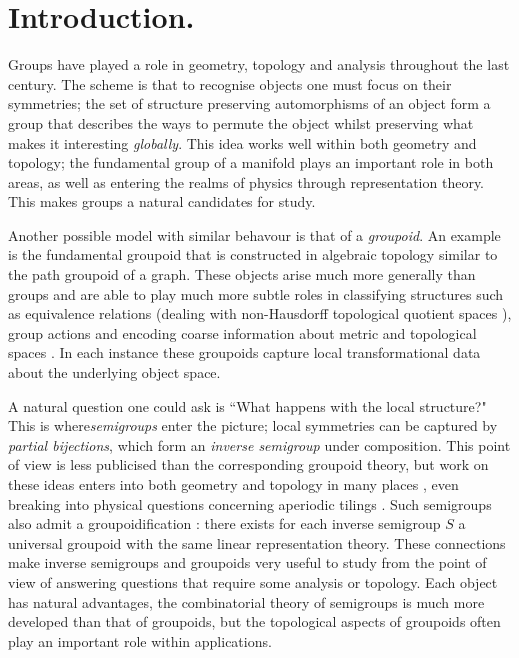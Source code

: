 \chapter{Introduction.}

Groups have played a role in geometry, topology and analysis throughout the last century. The scheme is that to recognise objects one must focus on their symmetries; the set of structure preserving automorphisms of an object form a group that describes the ways to permute the object whilst preserving what makes it interesting \textit{globally}. This idea works well within both geometry and topology; the fundamental group of a manifold plays an important role in both areas, as well as entering the realms of physics through representation theory. This makes groups a natural candidates for study.

Another possible model with similar behavour is that of a \textit{groupoid}. An example is the fundamental groupoid that is constructed in algebraic topology similar to the path groupoid of a graph. These objects arise much more generally than groups and are able to play much more subtle roles in classifying structures such as equivalence relations (dealing with non-Hausdorff topological quotient spaces \cite{MR1826266}), group actions and encoding coarse information about metric and topological spaces \cite{MR1905840}. In each instance these groupoids capture local transformational data about the underlying object space.

A natural question one could ask is ``What happens with the local structure?" This is where\textit{semigroups} enter the picture; local symmetries can be captured by \textit{partial bijections}, which form an \textit{inverse semigroup} under composition. This point of view is less publicised than the corresponding groupoid theory, but work on these ideas enters into both geometry and topology in many places \cite{MR0160848,MR1694900,MR1798993}, even breaking into physical questions concerning aperiodic tilings \cite{MR1798993,MR2041539}. Such semigroups also admit a groupoidification \cite{MR1724106,MR2419901}: there exists for each inverse semigroup $S$ a universal groupoid with the same linear representation theory. These connections make inverse semigroups and groupoids very useful to study from the point of view of answering questions that require some analysis or topology. Each object has natural advantages, the combinatorial theory of semigroups is much more developed than that of groupoids, but the topological aspects of groupoids often play an important role within applications.

